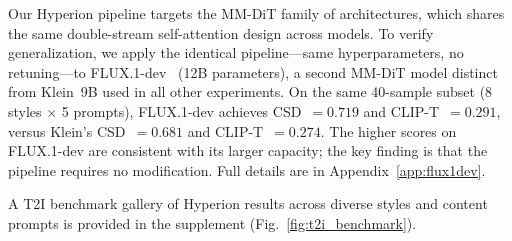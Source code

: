 Our Hyperion pipeline targets the MM-DiT family of architectures, which shares the same double-stream self-attention design across models.
To verify generalization, we apply the identical pipeline---same hyperparameters, no retuning---to FLUX.1-dev~\cite{flux2024} (12B parameters), a second MM-DiT model distinct from Klein~9B used in all other experiments.
On the same 40-sample subset (8 styles $\times$ 5 prompts), FLUX.1-dev achieves CSD~$= 0.719$ and CLIP-T~$= 0.291$, versus Klein's CSD~$= 0.681$ and CLIP-T~$= 0.274$.
The higher scores on FLUX.1-dev are consistent with its larger capacity; the key finding is that the pipeline requires no modification.
Full details are in Appendix~\ref{app:flux1dev}.

A T2I benchmark gallery of Hyperion results across diverse styles and content
prompts is provided in the supplement (Fig.~\ref{fig:t2i_benchmark}).
